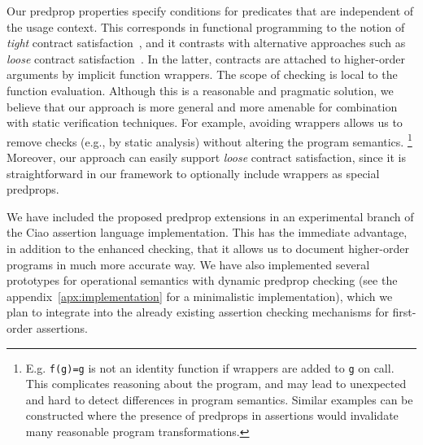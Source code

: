 \documentclass{llncs}
\begin{document}
Our predprop properties specify conditions for predicates that are
independent of the usage context. This corresponds in functional
programming to the notion of \emph{tight} contract
satisfaction~\cite{DBLP:journals/toplas/DimoulasF11}, and it contrasts
with alternative approaches such as \emph{loose} contract
satisfaction~\cite{DBLP:conf/icfp/FindlerF02}.
In the latter, contracts are attached to higher-order arguments by
implicit function wrappers. The scope of checking is local to the
function evaluation. Although this is a reasonable and pragmatic
solution, we believe that our approach is more general and more
amenable for combination with static verification techniques.
For example, avoiding wrappers allows us to remove checks (e.g., by
static analysis) without altering the program semantics.
\footnote{E.g. \texttt{f(g)=g} is not an identity function if wrappers
  are added to \texttt{g} on call. This complicates reasoning about the
  program, and may lead to unexpected and hard to detect differences in
  program semantics. Similar examples can be constructed where the
  presence of predprops in assertions would invalidate many reasonable
  program transformations.}
Moreover, our approach can easily support \emph{loose} contract
satisfaction, since it is straightforward in our framework to
optionally include wrappers as special predprops.

We have included the proposed predprop extensions in an experimental
branch of the Ciao assertion language implementation. This has the
immediate advantage, in addition to the enhanced checking, that it
allows us to document higher-order programs in much more accurate way.
We have also implemented several prototypes for operational semantics
with dynamic predprop checking (see the
appendix~\ref{apx:implementation} for a minimalistic implementation),
which we plan to integrate into the already existing assertion
checking mechanisms for first-order assertions.
\end{document}
